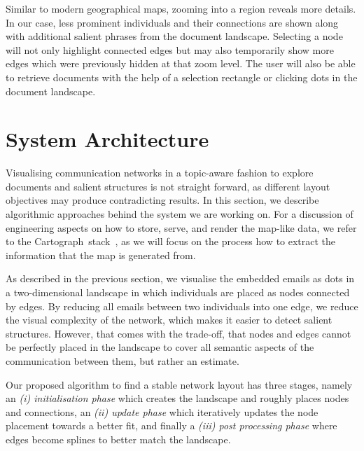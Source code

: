 Similar to modern geographical maps, zooming into a region reveals more details.
In our case, less prominent individuals and their connections are shown along with additional salient phrases from the document landscape.
Selecting a node will not only highlight connected edges but may also temporarily show more edges which were previously hidden at that zoom level.
The user will also be able to retrieve documents with the help of a selection rectangle or clicking dots in the document landscape.



\section{System Architecture}
Visualising communication networks in a topic-aware fashion to explore documents and salient structures is not straight forward, as different layout objectives may produce contradicting results.
In this section, we describe algorithmic approaches behind the system we are working on.
For a discussion of engineering aspects on how to store, serve, and render the map-like data, we refer to the Cartograph~stack~\cite{sen2017cartograph}, as we will focus on the process how to extract the information that the map is generated from.

As described in the previous section, we visualise the embedded emails as dots in a two-dimensional landscape in which individuals are placed as nodes connected by edges.
By reducing all emails between two individuals into one edge, we reduce the visual complexity of the network, which makes it easier to detect salient structures.
However, that comes with the trade-off, that nodes and edges cannot be perfectly placed in the landscape to cover all semantic aspects of the communication between them, but rather an estimate.

Our proposed algorithm to find a stable network layout has three stages, namely an \textit{(i) initialisation phase} which creates the landscape and roughly places nodes and connections, an \textit{(ii) update phase} which iteratively updates the node placement towards a better fit, and finally a \textit{(iii) post processing phase} where edges become splines to better match the landscape.


